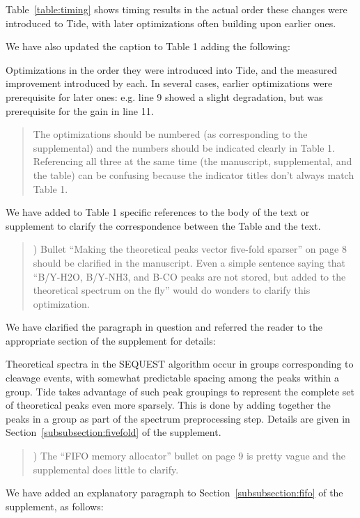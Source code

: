 \documentclass{article}
\newcommand{\breview}{\begin{quotation}\begin{em}\noindent}
\newcommand{\ereview}{\end{em}\end{quotation}}
\begin{document}
Table~\ref{table:timing} shows timing results in the actual order
these changes were introduced to Tide, with later optimizations often
building upon earlier ones.

We have also updated the caption to Table 1 adding the following:

Optimizations in the order they were introduced into Tide, and the
measured improvement introduced by each. In several cases, earlier
optimizations were prerequisite for later ones: e.g. line 9 showed a
slight degradation, but was prerequisite for the gain in line 11.

\breview The optimizations should be numbered (as corresponding to the
supplemental) and the numbers should be indicated clearly in Table 1.
Referencing all three at the same time (the manuscript, supplemental,
and the table) can be confusing because the indicator titles don't
always match Table 1.  \ereview

We have added to Table 1 specific references to the body of the text
or supplement to clarify the correspondence between the Table and the
text.

\breview 2) Bullet ``Making the theoretical peaks vector five-fold
sparser'' on page 8 should be clarified in the manuscript.  Even a
simple sentence saying that ``B/Y-H2O, B/Y-NH3, and B-CO peaks are not
stored, but added to the theoretical spectrum on the fly'' would do
wonders to clarify this optimization.
\ereview

We have clarified the paragraph in question and referred the reader to
the appropriate section of the supplement for details:

Theoretical spectra in the SEQUEST algorithm occur in groups
corresponding to cleavage events, with somewhat predictable spacing
among the peaks within a group. Tide takes advantage of such peak
groupings to represent the complete set of theoretical peaks even more
sparsely. This is done by adding together the peaks in a group as part
of the spectrum preprocessing step. Details are given in
Section~\ref{subsubsection:fivefold} of the supplement.

\breview 3) The ``FIFO memory allocator'' bullet on page 9 is pretty
vague and the supplemental does little to clarify.
\ereview

We have added an explanatory paragraph to
Section~\ref{subsubsection:fifo} of the supplement, as follows:
\end{document}
